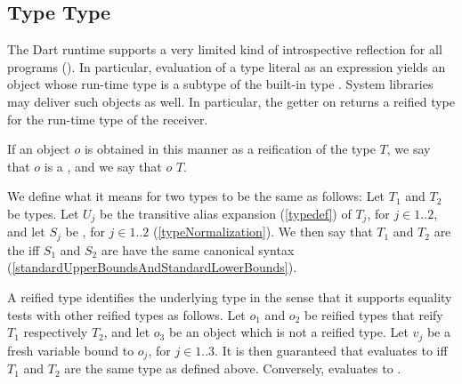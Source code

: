 \documentclass[makeidx]{article}
\begin{document}



\subsection{Type Type}

\LMHash{}%
The Dart runtime supports a very limited kind of introspective reflection
for all programs
().
In particular, evaluation of a type literal as an expression yields
an object whose run-time type is a subtype of the built-in type .
System libraries may deliver such objects as well.
In particular, the getter  on 
returns a reified type for the run-time type of the receiver.

\LMHash{}%
If an object $o$ is obtained in this manner
as a reification of the type $T$,
we say that $o$ is a ,
and we say that $o$  $T$.

\LMHash{}%
We define what it means for two types to be the same as follows:
Let $T_1$ and $T_2$ be types.
Let $U_j$ be the transitive alias expansion
(\ref{typedef}) of $T_j$, for $j \in 1 .. 2$,
and let $S_j$ be , for $j \in 1 .. 2$
(\ref{typeNormalization}).
We then say that $T_1$ and $T_2$ are the 
if{}f $S_1$ and $S_2$ are have the same canonical syntax
(\ref{standardUpperBoundsAndStandardLowerBounds}).

\LMHash{}%
A reified type identifies the underlying type in the sense that
it supports equality tests with other reified types as follows.
Let $o_1$ and $o_2$ be reified types that reify $T_1$ respectively $T_2$,
and let $o_3$ be an object which is not a reified type.
Let $v_j$ be a fresh variable bound to $o_j$, for $j \in 1 .. 3$.
It is then guaranteed that  evaluates to \TRUE{}
if{}f $T_1$ and $T_2$ are the same type as defined above.
Conversely,  evaluates to \FALSE.
\end{document}
